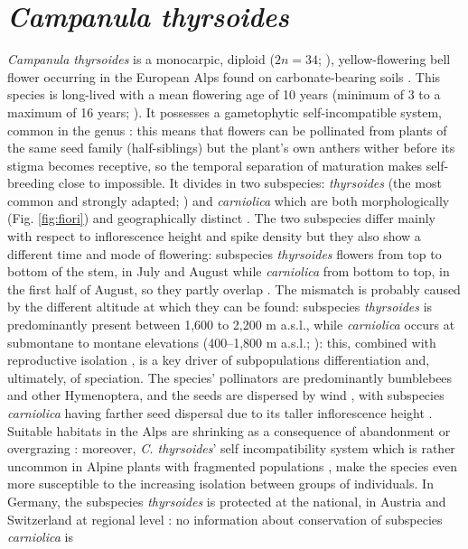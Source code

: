 \documentclass[a4paper, 12pt]{report}
\begin{document}
\section{\textit{Campanula thyrsoides}}
\textit{Campanula thyrsoides} is a monocarpic, diploid ($2n = 34$;  \cite{aegisdottirIsolatedPopulationsRare2009}), yellow-flowering bell flower occurring in the European Alps \parencite{scheepensDifferentiationMorphologyFlowering2011} found on carbonate-bearing soils \parencite{aegisdottirIsolatedPopulationsRare2009}. This species is long-lived with a mean flowering age of 10 years (minimum of 3 to a maximum of 16 years; \cite{freiHighGeneticDifferentiation2012}). It possesses a gametophytic self-incompatible system, common in the genus \parencite{aegisdottirNoInbreedingDepression2007}: this means that flowers can be pollinated from plants of the same seed family (half-siblings) but the plant's own anthers wither before its stigma becomes receptive, so the temporal separation of maturation makes self-breeding close to impossible. It divides in two subspecies: \textit{thyrsoides} (the most common \parencite{kussSpatialGeneticStructure2011} and strongly adapted; \cite{scheepensDifferentiationMorphologyFlowering2011}) and \textit{carniolica} which are both morphologically (Fig. \ref{fig:fiori}) and geographically distinct \parencite{scheepensDifferentiationMorphologyFlowering2011}. The two subspecies differ mainly with respect to inflorescence height and spike density \parencite{kussSpatialGeneticStructure2011} but they also show a different time and mode of flowering: subspecies \textit{thyrsoides} flowers from top to bottom of the stem, in July and August while \textit{carniolica} from bottom to top, in the first half of August, so they partly overlap \parencite{scheepensDifferentiationMorphologyFlowering2011}. The mismatch is probably caused by the different altitude at which they can be found: subspecies \textit{thyrsoides} is predominantly present between 1,600 to 2,200 m a.s.l., while \textit{carniolica} occurs at submontane to montane elevations (400–1,800 m a.s.l.; \cite{scheepensDifferentiationMorphologyFlowering2011}): this, combined with reproductive isolation \parencite{coyneSpeciation2004}, is a key driver of subpopulations differentiation and, ultimately, of speciation. The species' pollinators are predominantly bumblebees and other Hymenoptera, and the seeds are dispersed by wind \parencite{aegisdottirIsolatedPopulationsRare2009}, with subspecies \textit{carniolica} having farther seed dispersal due to its taller inflorescence height \parencite{scheepensDifferentiationMorphologyFlowering2011}. Suitable habitats in the Alps are shrinking as a consequence of abandonment or overgrazing \parencite{freiHighGeneticDifferentiation2012}: moreover, \textit{C. thyrsoides}' self incompatibility system which is rather uncommon in Alpine plants with fragmented populations \parencite{aegisdottirNoInbreedingDepression2007}, make the species even more susceptible to the increasing isolation between groups of individuals. In Germany, the subspecies \textit{thyrsoides} is protected at the national, in Austria and Switzerland at regional level \parencite{kussSpatialGeneticStructure2011}: no information about conservation of subspecies \textit{carniolica} is 
\end{document}
